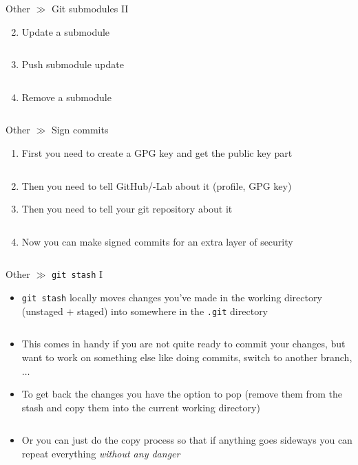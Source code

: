\documentclass[10pt]{beamer}
\begin{document}
\begin{frame}{Other $\gg$ Git submodules II}
	\begin{enumerate}\setcounter{enumi}{1}
		\item Update a submodule
		\inputminted[bgcolor=lightGreyCustom,fontsize=\scriptsize]{sh}{./resources/git_submodule_02_update.sh}
		\item Push submodule update
		\inputminted[bgcolor=lightGreyCustom,fontsize=\scriptsize]{sh}{./resources/git_submodule_03_push_update.sh}
		\item Remove a submodule
		\inputminted[bgcolor=lightGreyCustom,fontsize=\scriptsize]{sh}{./resources/git_submodule_04_remove.sh}
	\end{enumerate}
\end{frame}

\begin{frame}{Other $\gg$ Sign commits}
	\begin{enumerate}
		\item First you need to create a GPG key and get the public key part
		\inputminted[bgcolor=lightGreyCustom,fontsize=\scriptsize]{sh}{./resources/git_sign_commits_01_gpg_key.sh}
		\item Then you need to tell GitHub/-Lab about it (profile, GPG key)
		\item Then you need to tell your git repository about it
		\inputminted[bgcolor=lightGreyCustom,fontsize=\scriptsize]{sh}{./resources/git_sign_commits_02_register_key.sh}
		\item Now you can make signed commits for an extra layer of security
		\inputminted[bgcolor=lightGreyCustom,fontsize=\scriptsize]{sh}{./resources/git_sign_commits_03_signed_commit.sh}
	\end{enumerate}
\end{frame}

\begin{frame}{Other $\gg$ \texttt{git stash} I}
\begin{itemize}
	\item \texttt{git stash} locally moves changes you've made in the working directory (unstaged $+$ staged) into somewhere in the \texttt{.git} directory
	\inputminted[bgcolor=lightGreyCustom,fontsize=\scriptsize]{sh}{./resources/git_stash_01_stash.sh}
	\item This comes in handy if you are not quite ready to commit your changes, but want to work on something else like doing commits, switch to another branch, $\dots$
	\item To get back the changes you have the option to pop (remove them from the stash and copy them into the current working directory)
	\inputminted[bgcolor=lightGreyCustom,fontsize=\scriptsize]{sh}{./resources/git_stash_02_stash_pop.sh}
	\item Or you can just do the copy process so that if anything goes sideways you can repeat everything \textit{without any danger}
	\inputminted[bgcolor=lightGreyCustom,fontsize=\scriptsize]{sh}{./resources/git_stash_03_stash_apply.sh}
\end{itemize}
\end{frame}
\end{document}

